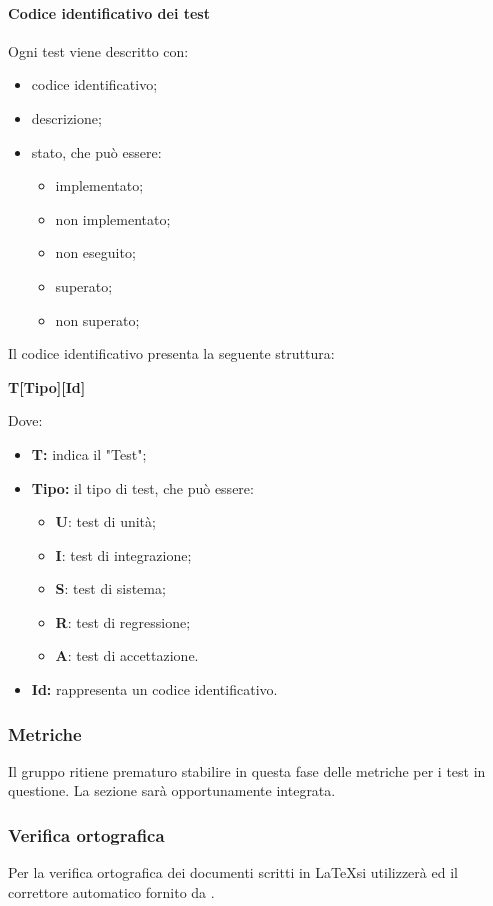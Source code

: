 \paragraph{Codice identificativo dei test}
Ogni test viene descritto con:
\begin{itemize}
	\item codice identificativo;
	\item descrizione;
	\item stato, che può essere:
	\begin{itemize}
		\item implementato;
		\item non implementato;
		\item non eseguito;
		\item superato;
		\item non superato;
	\end{itemize}
\end{itemize}
Il codice identificativo presenta la seguente struttura:\newline
\centerline{\textbf{T[Tipo][Id]}}
\newline
Dove:
\begin{itemize}
	\item \textbf{T:} indica il "Test";
	\item \textbf{Tipo:} il tipo di test, che può essere:
	\begin{itemize}
		\item \textbf{U}: test di unità;
		\item \textbf{I}: test di integrazione;
		\item \textbf{S}: test di sistema;
		\item \textbf{R}: test di regressione;
		\item \textbf{A}: test di accettazione.
	\end{itemize}
	\item \textbf{Id:} rappresenta un codice identificativo.
\end{itemize}

\subsubsection{Metriche}
Il gruppo ritiene prematuro stabilire in questa fase delle metriche per i test in questione. La sezione sarà opportunamente integrata.
\subsubsection{Verifica ortografica}
Per la verifica ortografica dei documenti scritti in \LaTeX si utilizzerà   ed il correttore automatico fornito da .
